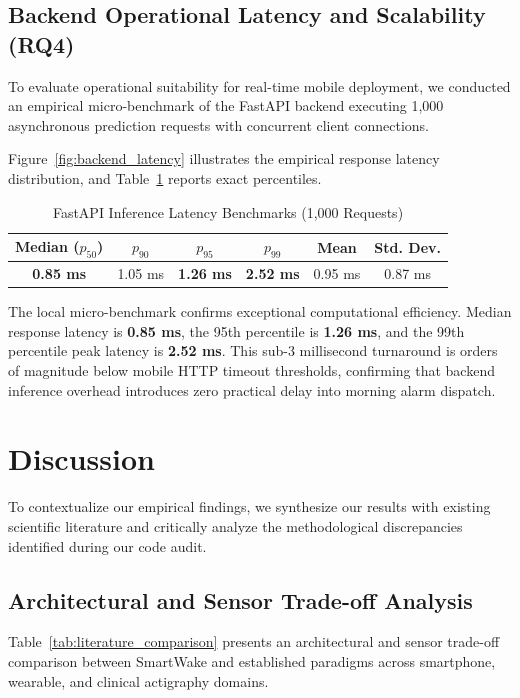\documentclass[journal,11pt,onecolumn]{IEEEtran}
\begin{document}
\subsection{Backend Operational Latency and Scalability (RQ4)}
To evaluate operational suitability for real-time mobile deployment, we conducted an empirical micro-benchmark of the FastAPI backend executing 1,000 asynchronous prediction requests with concurrent client connections. 

Figure~\ref{fig:backend_latency} illustrates the empirical response latency distribution, and Table~\ref{tab:latency_benchmarks} reports exact percentiles.

\begin{table}[h]
\centering
\caption{FastAPI Inference Latency Benchmarks (1,000 Requests)}
\label{tab:latency_benchmarks}
\begin{tabular}{cccccc}
\toprule
\textbf{Median ($p_{50}$)} & \textbf{$p_{90}$} & \textbf{$p_{95}$} & \textbf{$p_{99}$} & \textbf{Mean} & \textbf{Std. Dev.} \\
\midrule
\textbf{0.85 ms} & 1.05 ms & \textbf{1.26 ms} & \textbf{2.52 ms} & 0.95 ms & 0.87 ms \\
\bottomrule
\end{tabular}
\end{table}

The local micro-benchmark confirms exceptional computational efficiency. Median response latency is \textbf{0.85 ms}, the 95th percentile is \textbf{1.26 ms}, and the 99th percentile peak latency is \textbf{2.52 ms}. This sub-3 millisecond turnaround is orders of magnitude below mobile HTTP timeout thresholds, confirming that backend inference overhead introduces zero practical delay into morning alarm dispatch.

\section{Discussion}
\label{sec:discussion}\hypertarget{sec:discussion}{}

To contextualize our empirical findings, we synthesize our results with existing scientific literature and critically analyze the methodological discrepancies identified during our code audit.

\subsection{Architectural and Sensor Trade-off Analysis}
Table~\ref{tab:literature_comparison} presents an architectural and sensor trade-off comparison between SmartWake and established paradigms across smartphone, wearable, and clinical actigraphy domains.
\end{document}
